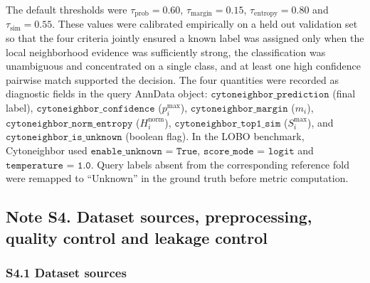 \documentclass[11pt]{article}
\begin{document}
The default thresholds were \(\tau_{\mathrm{prob}}=0.60\), \(\tau_{\mathrm{margin}}=0.15\), \(\tau_{\mathrm{entropy}}=0.80\) and \(\tau_{\mathrm{sim}}=0.55\). These values were calibrated empirically on a held out validation set so that the four criteria jointly ensured a known label was assigned only when the local neighborhood evidence was sufficiently strong, the classification was unambiguous and concentrated on a single class, and at least one high confidence pairwise match supported the decision. The four quantities were recorded as diagnostic fields in the query AnnData object: \(\texttt{cytoneighbor\_prediction}\) (final label), \(\texttt{cytoneighbor\_confidence}\) (\(p_i^{\max}\)), \(\texttt{cytoneighbor\_margin}\) (\(m_i\)), \(\texttt{cytoneighbor\_norm\_entropy}\) (\(H_i^{\mathrm{norm}}\)), \(\texttt{cytoneighbor\_top1\_sim}\) (\(S_i^{\max}\)), and \(\texttt{cytoneighbor\_is\_unknown}\) (boolean flag). In the LOBO benchmark, Cytoneighbor used \(\texttt{enable\_unknown = True}\), \(\texttt{score\_mode = logit}\) and \(\texttt{temperature = 1.0}\). Query labels absent from the corresponding reference fold were remapped to ``Unknown'' in the ground truth before metric computation.

\subsection*{Note S4. Dataset sources, preprocessing, quality control and leakage control}

\subsubsection*{S4.1 Dataset sources}
\end{document}
